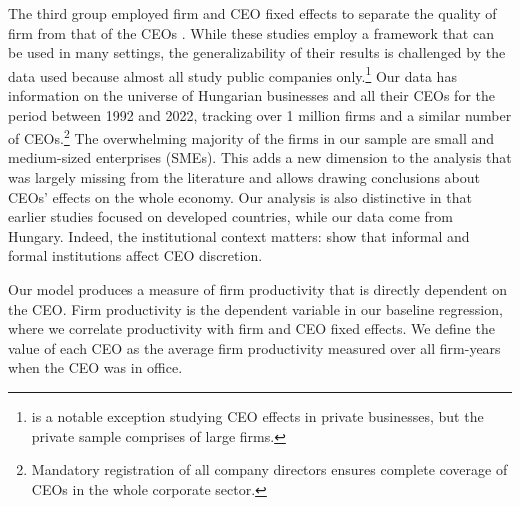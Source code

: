\documentclass[11pt,a4paper]{article}
\begin{document}
The third group employed firm and CEO fixed effects to separate the quality of firm from that of the CEOs \citep{Bertrand2003-io, crossland2011differences, quigley2015has}. While these studies employ a framework that can be used in many settings, the generalizability of their results is challenged by the data used because almost all study public companies only.\footnote{\citet{quigley2022ceo} is a notable exception studying CEO effects in private businesses, but the private sample comprises of large firms.} Our data has information on the universe of Hungarian businesses and all their CEOs for the period between 1992 and 2022, tracking over 1 million firms and a similar number of CEOs.\footnote{Mandatory registration of all company directors ensures complete coverage of CEOs in the whole corporate sector.} The overwhelming majority of the firms in our sample are small and medium-sized enterprises (SMEs). This adds a new dimension to the analysis that was largely missing from the literature and allows drawing conclusions about CEOs' effects on the whole economy. Our analysis is also distinctive in that earlier studies focused on developed countries, while our data come from Hungary. Indeed, the institutional context matters: \citet{crossland2011differences} show that informal and formal institutions affect CEO discretion.


Our model produces a measure of firm productivity that is directly dependent on the CEO. Firm productivity is the dependent variable in our baseline regression, where we correlate productivity with firm and CEO fixed effects. We define the value of each CEO as the average firm productivity measured over all firm-years when the CEO was in office.
\end{document}

